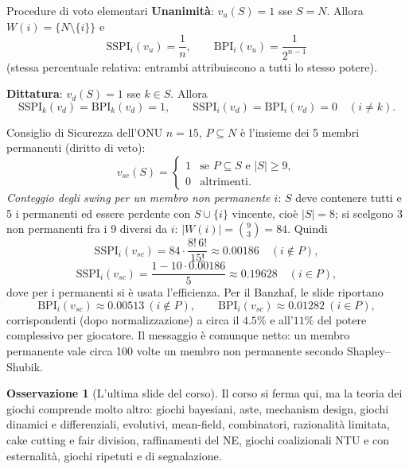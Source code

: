\documentclass[12pt,a4paper,twoside]{book}
\theoremstyle{plain}
\theoremstyle{definition}
\newtheorem{remark}[theorem]{Osservazione}
\begin{document}
\begin{exbox}{Procedure di voto elementari}
\textbf{Unanimità}: $v_u(S)=1$ sse $S=N$. Allora $W(i)=\{N\setminus\{i\}\}$ e
\[
  \mathrm{SSPI}_i(v_u)=\frac1n,\qquad \mathrm{BPI}_i(v_u)=\frac{1}{2^{n-1}}
\]
(stessa percentuale relativa: entrambi attribuiscono a tutti lo stesso potere).

\textbf{Dittatura}: $v_d(S)=1$ sse $k\in S$. Allora
\[
  \mathrm{SSPI}_k(v_d)=\mathrm{BPI}_k(v_d)=1,\qquad
  \mathrm{SSPI}_i(v_d)=\mathrm{BPI}_i(v_d)=0\quad (i\ne k).
\]
\end{exbox}

\begin{exbox}{Consiglio di Sicurezza dell'ONU}
$n=15$, $P\subseteq N$ è l'insieme dei 5 membri permanenti (diritto di veto):
\[
  v_{sc}(S)=\begin{cases}1 & \text{se } P\subseteq S \text{ e } |S|\ge 9,\\ 0&\text{altrimenti.}\end{cases}
\]
\emph{Conteggio degli swing per un membro non permanente $i$}: $S$ deve contenere
tutti e 5 i permanenti ed essere perdente con $S\cup\{i\}$ vincente, cioè
$|S|=8$; si scelgono 3 non permanenti fra i 9 diversi da $i$:
$|W(i)|=\binom93=84$. Quindi
\[
  \mathrm{SSPI}_i(v_{sc})=84\cdot\frac{8!\,6!}{15!}\approx 0.00186\quad (i\notin P),
\]
\[
  \mathrm{SSPI}_i(v_{sc})=\frac{1-10\cdot 0.00186}{5}\approx 0.19628\quad (i\in P),
\]
dove per i permanenti si è usata l'efficienza. Per il Banzhaf, le slide riportano
\[
  \mathrm{BPI}_i(v_{sc})\approx 0.00513\ (i\notin P),\qquad
  \mathrm{BPI}_i(v_{sc})\approx 0.01282\ (i\in P),
\]
corrispondenti (dopo normalizzazione) a circa il $4.5\%$ e all'$11\%$ del potere
complessivo per giocatore. Il messaggio è comunque netto: un membro permanente
vale circa 100 volte un membro non permanente secondo Shapley--Shubik.
\end{exbox}

\begin{remark}[L'ultima slide del corso]
Il corso si ferma qui, ma la teoria dei giochi comprende molto altro: giochi
bayesiani, aste, mechanism design, giochi dinamici e differenziali, evolutivi,
mean-field, combinatori, razionalità limitata, cake cutting e fair division,
raffinamenti del NE, giochi coalizionali NTU e con esternalità, giochi ripetuti
e di segnalazione.
\end{remark}
\end{document}
